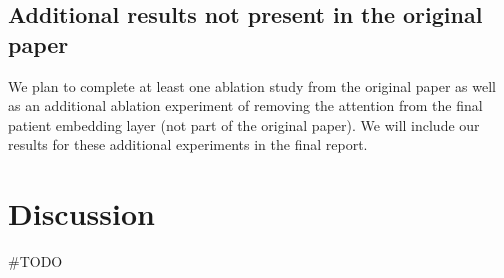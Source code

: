 \documentclass[11pt,a4paper,fleqn]{article}
\begin{document}
\subsection{Additional results not present in the original paper}
We plan to complete at least one ablation study from the original paper as well
as an additional ablation experiment of removing the attention from the final
patient embedding layer (not part of the original paper). We will include our
results for these additional experiments in the final report.

\section{Discussion}
\#TODO



\end{document}
